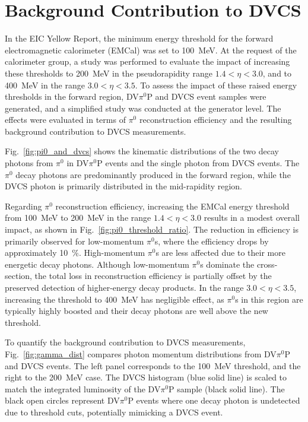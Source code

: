 \documentclass[letterpaper,12pt]{article}
\begin{document}
\section{Background Contribution to DVCS}\label{sec:Background}
In the EIC Yellow Report, the minimum energy threshold for the forward electromagnetic calorimeter (EMCal) was set to 100~MeV. At the request of the calorimeter group, a study was performed to evaluate the impact of increasing these thresholds to 200~MeV in the pseudorapidity range $1.4 < \eta < 3.0$, and to 400~MeV in the range $3.0 < \eta < 3.5$. To assess the impact of these raised energy thresholds in the forward region, DV$\pi^{0}$P and DVCS event samples were generated, and a simplified study was conducted at the generator level. The effects were evaluated in terms of $\pi^{0}$ reconstruction efficiency and the resulting background contribution to DVCS measurements.

Fig.~\ref{fig:pi0_and_dvcs} shows the kinematic distributions of the two decay photons from $\pi^{0}$ in DV$\pi^{0}$P events and the single photon from DVCS events. The $\pi^{0}$ decay photons are predominantly produced in the forward region, while the DVCS photon is primarily distributed in the mid-rapidity region.

Regarding $\pi^{0}$ reconstruction efficiency, increasing the EMCal energy threshold from 100~MeV to 200~MeV in the range $1.4 < \eta < 3.0$ results in a modest overall impact, as shown in Fig.~\ref{fig:pi0_threshold_ratio}. The reduction in efficiency is primarily observed for low-momentum $\pi^{0}$s, where the efficiency drops by approximately 10~\%. High-momentum $\pi^{0}$s are less affected due to their more energetic decay photons. Although low-momentum $\pi^{0}$s dominate the cross-section, the total loss in reconstruction efficiency is partially offset by the preserved detection of higher-energy decay products. In the range $3.0 < \eta < 3.5$, increasing the threshold to 400~MeV has negligible effect, as $\pi^{0}$s in this region are typically highly boosted and their decay photons are well above the new threshold.

To quantify the background contribution to DVCS measurements, Fig.~\ref{fig:gamma_dist} compares photon momentum distributions from DV$\pi^{0}$P and DVCS events. The left panel corresponds to the 100~MeV threshold, and the right to the 200~MeV case. The DVCS histogram (blue solid line) is scaled to match the integrated luminosity of the DV$\pi^{0}$P sample (black solid line). The black open circles represent DV$\pi^{0}$P events where one decay photon is undetected due to threshold cuts, potentially mimicking a DVCS event.
\end{document}
